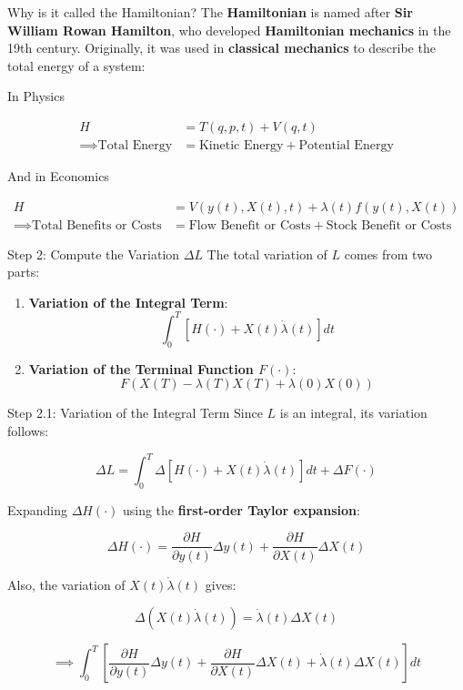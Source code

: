\documentclass[
  ignorenonframetext,
]{beamer}
\providecommand{\tightlist}{%
  \setlength{\itemsep}{0pt}\setlength{\parskip}{0pt}}\usepackage{longtable,booktabs,array}
\begin{document}
\begin{frame}{Why is it called the Hamiltonian?}
\label{why-is-it-called-the-hamiltonian}
The \textbf{Hamiltonian} is named after \textbf{Sir William Rowan
Hamilton}, who developed \textbf{Hamiltonian mechanics} in the 19th
century. Originally, it was used in \textbf{classical mechanics} to
describe the total energy of a system:

In Physics

\begin{align}
H &= T(q, p, t) + V(q, t) \\
\implies \text{Total Energy} &= \text{Kinetic Energy} + \text{Potential Energy}
\end{align}

And in Economics

\begin{align}
H &= V(y(t), X(t), t) + \lambda(t)f(y(t), X(t)) \\ 
\implies \text{Total Benefits or Costs} &= \text{Flow Benefit or Costs} + \text{Stock Benefit or Costs}
\end{align}
\end{frame}

\begin{frame}{Step 2: Compute the Variation \(\Delta L\)}
\label{step-2-compute-the-variation-delta-l}
The total variation of \(L\) comes from two parts:

\begin{enumerate}
\tightlist
\item
  \textbf{Variation of the Integral Term}: \[
  \int_0^T \left[H(\cdot) + X(t)\dot{\lambda}(t)\right] dt
  \]
\item
  \textbf{Variation of the Terminal Function \(F(\cdot)\)}: \[
  F(X(T)- \lambda(T)X(T) + \lambda(0)X(0))
  \]
\end{enumerate}
\end{frame}

\begin{frame}{Step 2.1: Variation of the Integral Term}
\label{step-2.1-variation-of-the-integral-term}
Since \(L\) is an integral, its variation follows:

\[
\Delta L = \int_0^T \Delta \left[ H(\cdot) + X(t)\dot{\lambda}(t) \right] dt + \Delta F(\cdot)
\]

Expanding \(\Delta H(\cdot)\) using the \textbf{first-order Taylor
expansion}:

\[
\Delta H(\cdot) = \frac{\partial H}{\partial y(t)} \Delta y(t) + \frac{\partial H}{\partial X(t)} \Delta X(t)
\]

Also, the variation of \(X(t) \dot{\lambda}(t)\) gives:

\[
\Delta (X(t) \dot{\lambda}(t)) = \dot{\lambda}(t) \Delta X(t)
\]

\[
\implies \int_0^T \left[ 
\frac{\partial H}{\partial y(t)} \Delta y(t) + 
\frac{\partial H}{\partial X(t)} \Delta X(t) + 
\dot{\lambda}(t) \Delta X(t)
\right] dt
\]
\end{frame}
\end{document}
